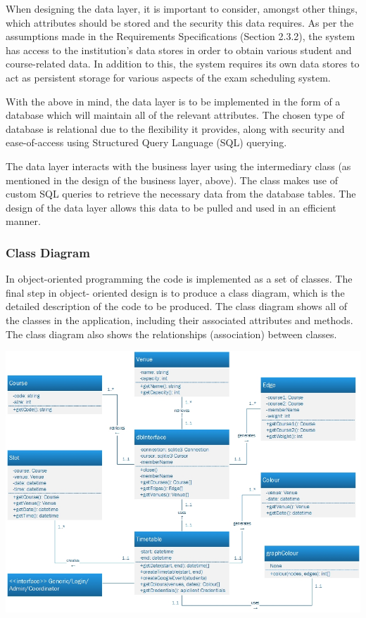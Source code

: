 \documentclass{article}
\begin{document}
When designing the data layer, it is important to consider, amongst other things, which attributes should be
stored and the security this data requires. As per the assumptions made in the Requirements Specifications (Section 2.3.2), the system has access to the institution's data stores in order to obtain various student and course-related data. In addition to this, the system requires its own data stores to act as persistent storage for various aspects of the exam scheduling system.

With the above in mind, the data layer is to be implemented in the form of a database which will maintain all of the relevant attributes. The chosen type of database is relational due to the flexibility it provides, along with security and ease-of-access using Structured Query Language (SQL) querying.

The data layer interacts with the business layer using the intermediary class (as mentioned in the design of the business layer, above). The class makes use of custom SQL queries to retrieve the necessary data from the database tables. The design of the data layer allows this data to be pulled and used in an efficient manner.

\subsubsection{Class Diagram}

In object-oriented programming the code is implemented as a set of classes. The final step in object-
oriented design is to produce a class diagram, which is the detailed description of the code to be produced.
The class diagram shows all of the classes in the application, including their associated attributes and
methods. The class diagram also shows the relationships (association) between classes.
\bigskip

\centerline{\includegraphics[scale=0.7]{ClassDiagram}}
\end{document}
